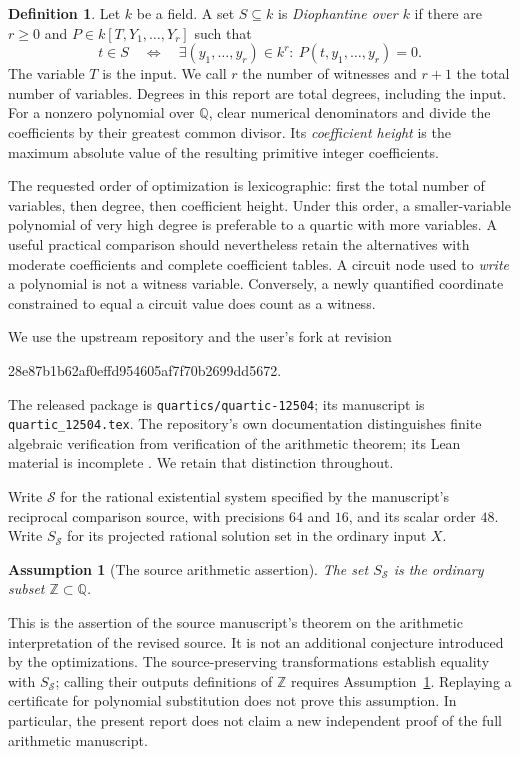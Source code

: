 \documentclass[11pt]{article}
\newtheorem{assumption}[theorem]{Assumption}
\theoremstyle{definition}
\newtheorem{definition}[theorem]{Definition}
\newcommand{\Q}{\mathbb Q}
\newcommand{\Z}{\mathbb Z}
\newcommand{\Src}{\mathcal S}
\begin{document}
\begin{definition}
Let $k$ be a field. A set $S\subseteq k$ is \emph{Diophantine over $k$}
if there are $r\geq0$ and $P\in k[T,Y_1,\ldots,Y_r]$ such that
\[
 t\in S\quad\Longleftrightarrow\quad
 \exists(y_1,\ldots,y_r)\in k^r:\ P(t,y_1,\ldots,y_r)=0.
\]
The variable $T$ is the input. We call $r$ the number of witnesses and
$r+1$ the total number of variables. Degrees in this report are total
degrees, including the input. For a nonzero polynomial over $\Q$, clear
numerical denominators and divide the coefficients by their greatest
common divisor. Its \emph{coefficient height} is the maximum absolute
value of the resulting primitive integer coefficients.
\end{definition}

The requested order of optimization is lexicographic: first the total
number of variables, then degree, then coefficient height. Under this
order, a smaller-variable polynomial of very high degree is preferable
to a quartic with more variables. A useful practical comparison should
nevertheless retain the alternatives with moderate coefficients and
complete coefficient tables. A circuit node used to \emph{write} a
polynomial is not a witness variable. Conversely, a newly quantified
coordinate constrained to equal a circuit value does count as a witness.

We use the upstream repository and the user's fork at revision
\begin{center}\small\ttfamily
28e87b1b62af0effd954605af7f70b2699dd5672.
\end{center}
The released package is \texttt{quartics/quartic-12504}; its manuscript
is \texttt{quartic\_12504.tex}. The repository's own documentation
distinguishes finite algebraic verification from verification of the
arithmetic theorem; its Lean material is incomplete
\cite{Repository2026}. We retain that distinction throughout.

Write $\Src$ for the rational existential system specified by the
manuscript's reciprocal comparison source, with precisions $64$ and
$16$, and its scalar order $48$. Write $S_{\Src}$ for its projected
rational solution set in the ordinary input $X$.

\begin{assumption}[The source arithmetic assertion]\label{ass:source}
The set $S_{\Src}$ is the ordinary subset $\Z\subset\Q$.
\end{assumption}

This is the assertion of the source manuscript's theorem on the
arithmetic interpretation of the revised source. It is not an additional
conjecture introduced by the optimizations. The source-preserving transformations
establish equality with $S_{\Src}$; calling their outputs definitions
of $\Z$ requires Assumption~\ref{ass:source}. Replaying a certificate
for polynomial substitution does not prove this assumption. In
particular, the present report does not claim a new independent proof
of the full arithmetic manuscript.
\end{document}
